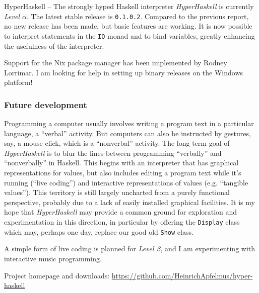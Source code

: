 \begin{hcarentry}[updated]{HyperHaskell -- The strongly hyped Haskell interpreter}
\emph{HyperHaskell} is currently \emph{Level $\alpha$}. The latest stable release is \verb`0.1.0.2`.
Compared to the previous report, no new release has been made, but basic features are working.
It is now possible to interpret statements in the \verb`IO` monad and to bind variables, greatly enhancing the usefulness of the interpreter.

Support for the Nix package manager has been implemented by Rodney Lorrimar.
I am looking for help in setting up binary releases on the Windows platform!

\subsubsection*{Future development}

Programming a computer usually involves writing a program text in a particular
language, a ``verbal'' activity. But computers can also be instructed by
gestures, say, a mouse click, which is a ``nonverbal'' activity. The long term
goal of \emph{HyperHaskell} is to blur the lines between programming
``verbally'' and ``nonverbally'' in Haskell. This begins with an interpreter
that has graphical representations for values, but also includes editing a
program text while it's running (``live coding'') and interactive
representations of values (e.g. ``tangible values''). This territory is still
largely uncharted from a purely functional perspective, probably due to a lack
of easily installed graphical facilities. It is my hope that
\emph{HyperHaskell} may provide a common ground for exploration and
experimentation in this direction, in particular by offering the
\verb!Display! class which may, perhaps one day, replace our good old
\verb!Show! class.

A simple form of live coding is planned for \emph{Level $\beta$}, and I am experimenting with interactive music programming.

\FurtherReading
\begin{compactitem}
  \item Project homepage and downloads: \url{https://github.com/HeinrichApfelmus/hyper-haskell}
\end{compactitem}
\end{hcarentry}
